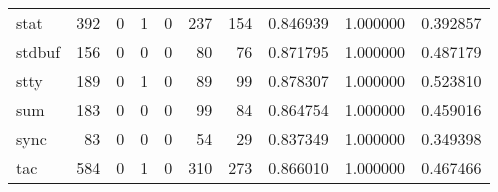 \begin{longtable}{lrrrrrrrrr}
stat      &                                   392 &                                                  0 &                                                  1 &                                                  0 &                                                237 &                                                154 &                                           0.846939 &                               1.000000 &                             0.392857 \\
stdbuf    &                                   156 &                                                  0 &                                                  0 &                                                  0 &                                                 80 &                                                 76 &                                           0.871795 &                               1.000000 &                             0.487179 \\
stty      &                                   189 &                                                  0 &                                                  1 &                                                  0 &                                                 89 &                                                 99 &                                           0.878307 &                               1.000000 &                             0.523810 \\
sum       &                                   183 &                                                  0 &                                                  0 &                                                  0 &                                                 99 &                                                 84 &                                           0.864754 &                               1.000000 &                             0.459016 \\
sync      &                                    83 &                                                  0 &                                                  0 &                                                  0 &                                                 54 &                                                 29 &                                           0.837349 &                               1.000000 &                             0.349398 \\
tac       &                                   584 &                                                  0 &                                                  1 &                                                  0 &                                                310 &                                                273 &                                           0.866010 &                               1.000000 &                             0.467466 \\

\end{longtable}
